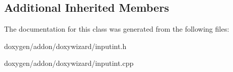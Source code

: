 \subsection*{Additional Inherited Members}


The documentation for this class was generated from the following files\+:\begin{DoxyCompactItemize}
\item 
doxygen/addon/doxywizard/inputint.\+h\item 
doxygen/addon/doxywizard/inputint.\+cpp\end{DoxyCompactItemize}
